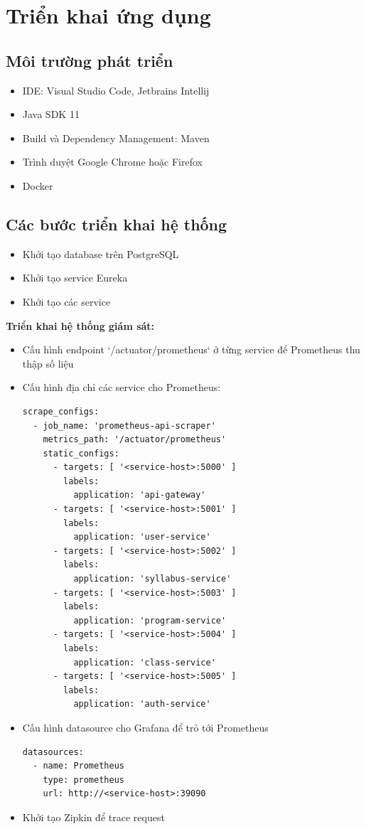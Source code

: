 \documentclass[report.tex]{subfiles}
\begin{document}
\pagebreak
\chapter[Chương 3. Triển khai ứng dụng]{Triển khai ứng dụng}

\section{Môi trường phát triển}

\begin{itemize}
\item IDE: Visual Studio Code, Jetbrains Intellij
\item Java SDK 11
\item Build và Dependency Management: Maven
\item Trình duyệt Google Chrome hoặc Firefox
\item Docker
\end{itemize}

\section{Các bước triển khai hệ thống}

\begin{itemize}
\item Khởi tạo database trên PostgreSQL
\item Khởi tạo service Eureka
\item Khởi tạo các service

\end{itemize}

\textbf{Triển khai hệ thống giám sát:}

\begin{itemize}
\item Cấu hình endpoint `/actuator/prometheus` ở từng service để Prometheus thu thập số liệu
\item Cấu hình địa chỉ các service cho Prometheus:

\begin{verbatim}
scrape_configs:
  - job_name: 'prometheus-api-scraper'
    metrics_path: '/actuator/prometheus'
    static_configs:
      - targets: [ '<service-host>:5000' ]
        labels:
          application: 'api-gateway'
      - targets: [ '<service-host>:5001' ]
        labels:
          application: 'user-service'
      - targets: [ '<service-host>:5002' ]
        labels:
          application: 'syllabus-service'
      - targets: [ '<service-host>:5003' ]
        labels:
          application: 'program-service'
      - targets: [ '<service-host>:5004' ]
        labels:
          application: 'class-service'
      - targets: [ '<service-host>:5005' ]
        labels:
          application: 'auth-service'
\end{verbatim}
\item Cấu hình datasource cho Grafana để trỏ tới Prometheus
\begin{verbatim}
datasources:
  - name: Prometheus
    type: prometheus
    url: http://<service-host>:39090
\end{verbatim}
\item Khởi tạo Zipkin để trace request
\end{itemize}
\end{document}
